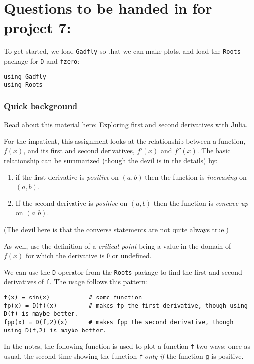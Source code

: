 \documentclass[12pt]{article}
\begin{document}
\section{Questions to be handed in for project 7:}

To get started, we load \texttt{Gadfly} so that we can make plots, and
load the \texttt{Roots} package for \texttt{D} and \texttt{fzero}:



\begin{verbatim}
using Gadfly            
using Roots         
\end{verbatim}
\subsubsection{Quick background}

Read about this material here:
\href{http://mth229.github.io/first-second-derivatives.html}{Exploring
first and second derivatives with Julia}.

For the impatient, this assignment looks at the relationship between a
function, $f(x)$, and its first and second derivatives, $f'(x)$ and
$f''(x)$. The basic relationship can be summarized (though the devil is
in the details) by:

\begin{enumerate}
\def\labelenumi{\arabic{enumi})}
\item
  if the first derivative is \emph{positive} on $(a,b)$ then the
  function is \emph{increasing} on $(a,b)$.
\item
  If the second derivative is \emph{positive} on $(a,b)$ then the
  function is \emph{concave up} on $(a,b)$.
\end{enumerate}

(The devil here is that the converse statements are not quite always
true.)

As well, use the definition of a \emph{critical point} being a value in
the domain of $f(x)$ for which the derivative is $0$ or undefined.

We can use the \texttt{D} operator from the \texttt{Roots} package to
find the first and second derivatives of \texttt{f}. The usage follows
this pattern:



\begin{verbatim}
f(x) = sin(x)           # some function
fp(x) = D(f)(x)         # makes fp the first derivative, though using D(f) is maybe better.
fpp(x) = D(f,2)(x)      # makes fpp the second derivative, though using D(f,2) is maybe better.
\end{verbatim}
In the notes, the following function is used to plot a function
\texttt{f} two ways: once as usual, the second time showing the function
\texttt{f} \emph{only if} the function \texttt{g} is positive.
\end{document}

